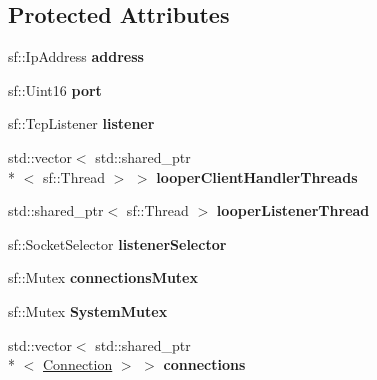 \subsection*{Protected Attributes}
\begin{DoxyCompactItemize}
\item 
\hypertarget{classbali_1_1_comm_ace98abb49d2799a7ad8c7411ce70eb32}{sf\-::\-Ip\-Address {\bfseries address}}\label{classbali_1_1_comm_ace98abb49d2799a7ad8c7411ce70eb32}

\item 
\hypertarget{classbali_1_1_comm_a552df864b32f3a75a59f7259902c97e2}{sf\-::\-Uint16 {\bfseries port}}\label{classbali_1_1_comm_a552df864b32f3a75a59f7259902c97e2}

\item 
\hypertarget{classbali_1_1_comm_a35b19f78f7f9bcbb19cf7a3ddc7b2f2e}{sf\-::\-Tcp\-Listener {\bfseries listener}}\label{classbali_1_1_comm_a35b19f78f7f9bcbb19cf7a3ddc7b2f2e}

\item 
\hypertarget{classbali_1_1_comm_a33af654daa0cd527065229186166a127}{std\-::vector$<$ std\-::shared\-\_\-ptr\\*
$<$ sf\-::\-Thread $>$ $>$ {\bfseries looper\-Client\-Handler\-Threads}}\label{classbali_1_1_comm_a33af654daa0cd527065229186166a127}

\item 
\hypertarget{classbali_1_1_comm_a319338a5d0cf706d268c1d421ab0cce9}{std\-::shared\-\_\-ptr$<$ sf\-::\-Thread $>$ {\bfseries looper\-Listener\-Thread}}\label{classbali_1_1_comm_a319338a5d0cf706d268c1d421ab0cce9}

\item 
\hypertarget{classbali_1_1_comm_a180de5883191dfb0deb57c5c0245591e}{sf\-::\-Socket\-Selector {\bfseries listener\-Selector}}\label{classbali_1_1_comm_a180de5883191dfb0deb57c5c0245591e}

\item 
\hypertarget{classbali_1_1_comm_ada07144b322e39803a798298d9f3313e}{sf\-::\-Mutex {\bfseries connections\-Mutex}}\label{classbali_1_1_comm_ada07144b322e39803a798298d9f3313e}

\item 
\hypertarget{classbali_1_1_comm_a05763fae86e2f0d070445d8967af6cb4}{sf\-::\-Mutex {\bfseries System\-Mutex}}\label{classbali_1_1_comm_a05763fae86e2f0d070445d8967af6cb4}

\item 
\hypertarget{classbali_1_1_comm_a38d0d5bba3951bc7af7870457904f950}{std\-::vector$<$ std\-::shared\-\_\-ptr\\*
$<$ \hyperlink{classbali_1_1_connection}{Connection} $>$ $>$ {\bfseries connections}}\label{classbali_1_1_comm_a38d0d5bba3951bc7af7870457904f950}


\end{DoxyCompactItemize}
